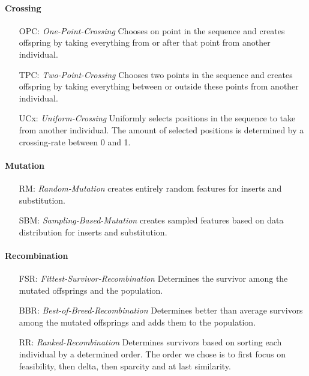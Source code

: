 \documentclass[./../../paper.tex]{subfiles}
\begin{document}
\paragraph{Crossing}
\begin{enumerate}
    \item[OPC:] \emph{One-Point-Crossing} Chooses on point in the sequence and creates offspring by taking everything from or after that point from another individual. 
    \item[TPC:] \emph{Two-Point-Crossing} Chooses two points in the sequence and creates offspring by taking everything between or outside these points from another individual. 
    \item[UCx:] \emph{Uniform-Crossing} Uniformly selects positions in the sequence to take from another individual. The amount of selected positions is determined by a crossing-rate between 0 and 1.
\end{enumerate}
\paragraph{Mutation}
\begin{enumerate}
    \item[RM:] \emph{Random-Mutation} creates entirely random features for inserts and substitution. 
    \item[SBM:] \emph{Sampling-Based-Mutation} creates sampled features based on data distribution for inserts and substitution. 
\end{enumerate}
\paragraph{Recombination}
\begin{enumerate}
    \item[FSR:] \emph{Fittest-Survivor-Recombination} Determines the survivor among the mutated offsprings and the population. 
    \item[BBR:] \emph{Best-of-Breed-Recombination} Determines better than average survivors among the mutated offsprings and adds them to the population. 
    \item[RR:] \emph{Ranked-Recombination} Determines survivors based on sorting each individual by a determined order. The order we chose is to first focus on feasibility, then delta, then sparcity and at last similarity. 
\end{enumerate}
\end{document}
